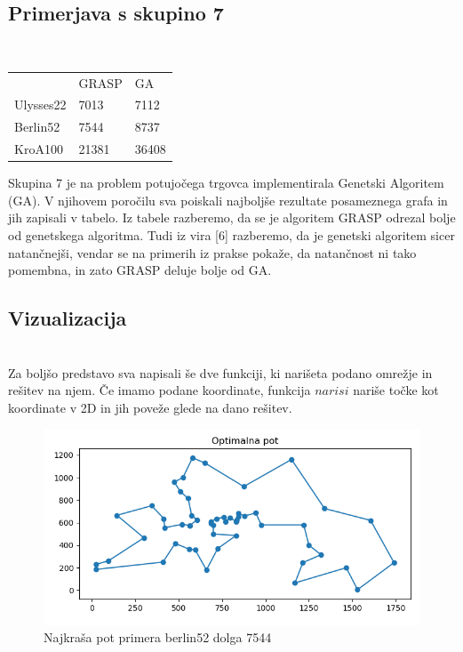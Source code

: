 \documentclass[12pt,a4paper]{amsart}
\theoremstyle{definition} %
\theoremstyle{plain} %
\begin{document}
\subsection{Primerjava s skupino 7} ~\\

\begin{table}[H]
\begin{tabular}{lll}
\rowcolor[HTML]{FFCCC9} 
          & GRASP & GA \\
Ulysses22 & 7013  & 7112               \\
Berlin52  & 7544  & 8737               \\
KroA100   & 21381 & 36408             
\end{tabular}
\end{table}

Skupina 7 je na problem potujočega trgovca implementirala Genetski Algoritem (GA). V njihovem poročilu sva poiskali najboljše rezultate posameznega grafa in jih zapisali v tabelo. Iz tabele razberemo, da se je algoritem GRASP odrezal bolje od genetskega algoritma.
Tudi iz vira [6] razberemo, da je genetski algoritem sicer natančnejši, vendar se na primerih iz prakse pokaže, da natančnost ni tako pomembna, in zato GRASP deluje bolje od GA.

\subsection{Vizualizacija} ~ \\
Za boljšo predstavo sva napisali še dve funkciji, ki narišeta podano omrežje in rešitev na njem.
Če imamo podane koordinate, funkcija $narisi$ nariše točke kot koordinate v 2D in jih poveže glede na dano rešitev.
\begin{figure}[H]
\caption{Najkraša pot primera berlin52 dolga 7544}
\centering
\includegraphics[scale =0.5]{berlin_7544}
\end{figure}
\end{document}
